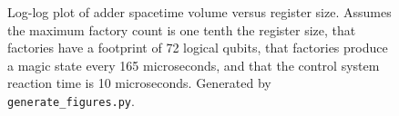 \documentclass[onecolumn,unpublished]{quantumarticle}
\theoremstyle{definition}
\theoremstyle{definition}
\theoremstyle{definition}
\begin{document}
\begin{figure}[H]
    \centering
    \endminipage
    \endminipage
    \caption{
        Log-log plot of adder spacetime volume versus register size. Assumes the maximum factory count is one tenth the register size, that factories have a footprint of 72 logical qubits, that factories produce a magic state every 165 microseconds, and that the control system reaction time is 10 microseconds.
        Generated by \texttt{generate\_figures.py}.
    }
    \label{fig:size_versus_volume}
\end{figure}
\end{document}
